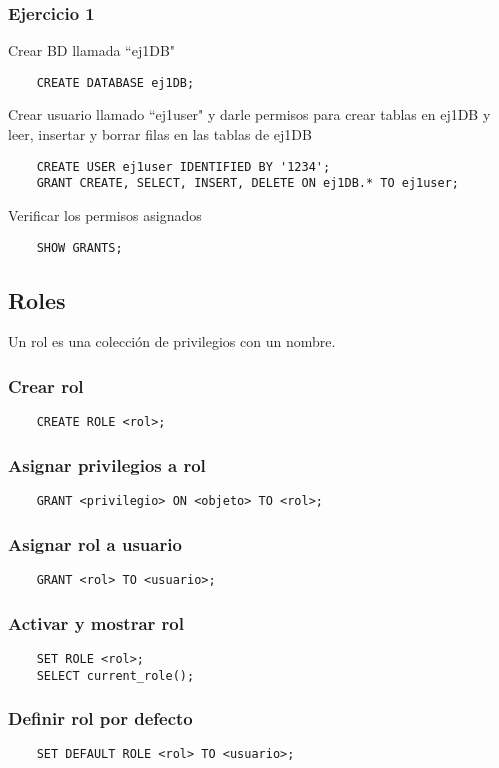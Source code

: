 \documentclass{article}
\begin{document}
\subsubsection{Ejercicio 1}
Crear BD llamada ``ej1DB"
\begin{verbatim}
	CREATE DATABASE ej1DB;
\end{verbatim}
Crear usuario llamado ``ej1user" y darle permisos para crear tablas en ej1DB y leer, insertar y borrar filas en las tablas de ej1DB
\begin{verbatim}
	CREATE USER ej1user IDENTIFIED BY '1234';
	GRANT CREATE, SELECT, INSERT, DELETE ON ej1DB.* TO ej1user;
\end{verbatim}
Verificar los permisos asignados
\begin{verbatim}
	SHOW GRANTS;
\end{verbatim}

\subsection{Roles}

Un rol es una colección de privilegios con un nombre.
\subsubsection{Crear rol}
\begin{verbatim}
	CREATE ROLE <rol>;
\end{verbatim}
\subsubsection{Asignar privilegios a rol}
\begin{verbatim}
	GRANT <privilegio> ON <objeto> TO <rol>;
\end{verbatim}
\subsubsection{Asignar rol a usuario}
\begin{verbatim}
	GRANT <rol> TO <usuario>;
\end{verbatim}
\subsubsection{Activar y mostrar rol}
\begin{verbatim}
	SET ROLE <rol>;
	SELECT current_role();
\end{verbatim}
\subsubsection{Definir rol por defecto}
\begin{verbatim}
	SET DEFAULT ROLE <rol> TO <usuario>;
\end{verbatim}
\end{document}
